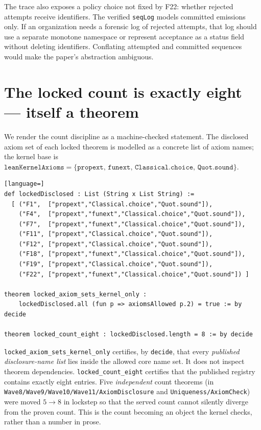 \documentclass[11pt,letterpaper]{article}
\theoremstyle{definition}
\newcommand{\kernelaxioms}{\{\texttt{propext},\,\texttt{funext},\,\texttt{Classical.choice},\,\texttt{Quot.sound}\}}
\begin{document}
The trace also exposes a policy choice not fixed by F22: whether rejected
attempts receive identifiers. The verified \texttt{seqLog} models committed
emissions only. If an organization needs a forensic log of rejected attempts,
that log should use a separate monotone namespace or represent acceptance as a
status field without deleting identifiers. Conflating attempted and committed
sequences would make the paper's abstraction ambiguous.

\section{The locked count is exactly eight --- itself a theorem}\label{sec:count}

We render the count discipline as a machine-checked statement. The disclosed
axiom set of each locked theorem is modelled as a concrete list of axiom names;
the kernel base is $\texttt{leanKernelAxioms} = \kernelaxioms$.

\begin{lstlisting}[language=]
def lockedDisclosed : List (String x List String) :=
  [ ("F1",  ["propext","Classical.choice","Quot.sound"]),
    ("F4",  ["propext","funext","Classical.choice","Quot.sound"]),
    ("F7",  ["propext","funext","Classical.choice","Quot.sound"]),
    ("F11", ["propext","Classical.choice","Quot.sound"]),
    ("F12", ["propext","Classical.choice","Quot.sound"]),
    ("F18", ["propext","funext","Classical.choice","Quot.sound"]),
    ("F19", ["propext","Classical.choice","Quot.sound"]),
    ("F22", ["propext","funext","Classical.choice","Quot.sound"]) ]

theorem locked_axiom_sets_kernel_only :
    lockedDisclosed.all (fun p => axiomsAllowed p.2) = true := by decide

theorem locked_count_eight : lockedDisclosed.length = 8 := by decide
\end{lstlisting}

\noindent\texttt{locked\_axiom\_sets\_kernel\_only} certifies, by \texttt{decide},
that every \emph{published disclosure-name list} lies inside the allowed core
name set. It does not inspect theorem dependencies. \texttt{locked\_count\_eight}
certifies that the published registry contains exactly eight entries. Five
\emph{independent} count theorems
(in \texttt{Wave8/Wave9/Wave10/Wave11/AxiomDisclosure} and
\texttt{Uniqueness/AxiomCheck}) were moved $5 \to 8$ in lockstep so that the
served count cannot silently diverge from the proven count. This is the count
becoming an object the kernel checks, rather than a number in prose.
\end{document}
